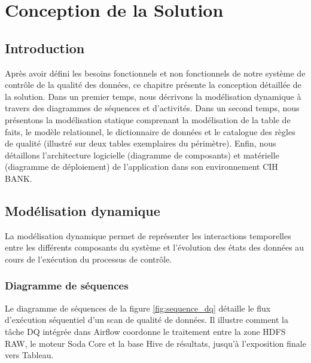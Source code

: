\chapter{Conception de la Solution}

\section*{Introduction}
Après avoir défini les besoins fonctionnels et non fonctionnels de notre système de contrôle de la qualité des données, ce chapitre présente la conception détaillée de la solution. Dans un premier temps, nous décrivons la modélisation dynamique à travers des diagrammes de séquences et d'activités. Dans un second temps, nous présentons la modélisation statique comprenant la modélisation de la table de faits, le modèle relationnel, le dictionnaire de données et le catalogue des règles de qualité (illustré sur deux tables exemplaires du périmètre). Enfin, nous détaillons l'architecture logicielle (diagramme de composants) et matérielle (diagramme de déploiement) de l'application dans son environnement CIH BANK.

\section{Modélisation dynamique}

La modélisation dynamique permet de représenter les interactions temporelles entre les différents composants du système et l'évolution des états des données au cours de l'exécution du processus de contrôle.

\subsection{Diagramme de séquences}
Le diagramme de séquences de la figure \ref{fig:sequence_dq} détaille le flux d'exécution séquentiel d'un scan de qualité de données. Il illustre comment la tâche DQ intégrée dans Airflow coordonne le traitement entre la zone HDFS RAW, le moteur Soda Core et la base Hive de résultats, jusqu'à l'exposition finale vers Tableau.

